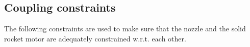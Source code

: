 \subsection{Coupling constraints}

The following constraints are used to make sure that the nozzle
and the solid rocket motor are adequately constrained
w.r.t. each other.






%

